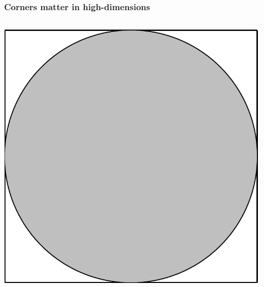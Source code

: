 \documentclass{beamer}
\begin{document}
\begin{frame}
\frametitle{Corners matter in high-dimensions}
\begin{columns}[c]
\includegraphics[width=.8\textwidth]{circle}


\end{columns}
\end{frame}
\end{document}
